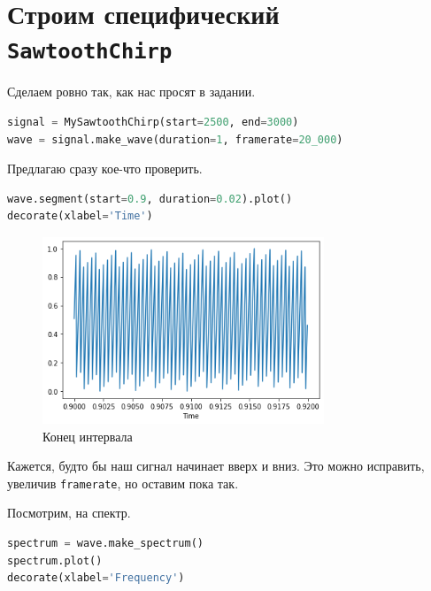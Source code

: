 \documentclass[a4paper,12pt]{report}
\begin{document}
    \chapter{Строим специфический \texttt{SawtoothChirp}}
    
    Сделаем ровно так, как нас просят в задании.
    
\begin{lstlisting}[language=Python,caption=Создаем сигнал и ...]
signal = MySawtoothChirp(start=2500, end=3000)
wave = signal.make_wave(duration=1, framerate=20_000)
\end{lstlisting}

    Предлагаю сразу кое-что проверить.
    
\begin{lstlisting}[language=Python,caption=Проверяем его]
wave.segment(start=0.9, duration=0.02).plot()
decorate(xlabel='Time')
\end{lstlisting}

    \begin{figure}[H]
        \centering
        \includegraphics[width=0.75\textwidth]{ex3_initial_test.png}
        \caption{Конец интервала}
        \label{fig:ex3_initial_test}
    \end{figure}
    
    Кажется, будто бы наш сигнал начинает  вверх и вниз. Это можно исправить, увеличив \texttt{framerate}, но оставим пока так.
    
    Посмотрим, на спектр.
    
\begin{lstlisting}[language=Python,caption=Спектр]
spectrum = wave.make_spectrum()
spectrum.plot()
decorate(xlabel='Frequency')
\end{lstlisting}
\end{document}
